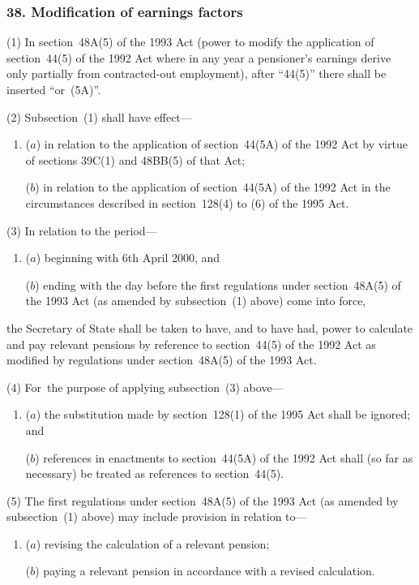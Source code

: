 \documentclass[12pt,a4paper]{article}
\begin{document}
\subsubsection{38. Modification of earnings factors}

(1) In section~48A(5)  of the 1993 Act (power to modify the application of section~44(5)  of the 1992 Act where in any year a pensioner’s earnings derive only partially from contracted-out employment), after “44(5)” there shall be inserted “or~(5A)”.

(2) Subsection~(1)  shall have effect—
\begin{enumerate}\item[]
($a$) in relation to the application of section~44(5A)  of the 1992 Act by virtue of sections 39C(1)  and 48BB(5)  of that Act;

($b$) in relation to the application of section~44(5A)  of the 1992 Act in the circumstances described in section~128(4)  to (6)  of the 1995 Act.
\end{enumerate}

(3) In relation to the period—
\begin{enumerate}\item[]
($a$) beginning with 6th April 2000, and

($b$) ending with the day before the first regulations under section~48A(5)  of the 1993 Act (as amended by subsection~(1)  above) come into force,
\end{enumerate}
the Secretary of State shall be taken to have, and to have had, power to calculate and pay relevant pensions by reference to section~44(5)  of the 1992 Act as modified by regulations under section~48A(5)  of the 1993 Act.

(4) For~the purpose of applying subsection~(3)  above—
\begin{enumerate}\item[]
($a$) the substitution made by section~128(1)  of the 1995 Act shall be ignored; and

($b$) references in enactments to section~44(5A)  of the 1992 Act shall (so far as necessary) be treated as references to section~44(5).
\end{enumerate}

(5) The first regulations under section~48A(5)  of the 1993 Act (as amended by subsection~(1)  above) may include provision in relation to—
\begin{enumerate}\item[]
($a$) revising the calculation of a relevant pension;

($b$) paying a relevant pension in accordance with a revised calculation.
\end{enumerate}
\end{document}
